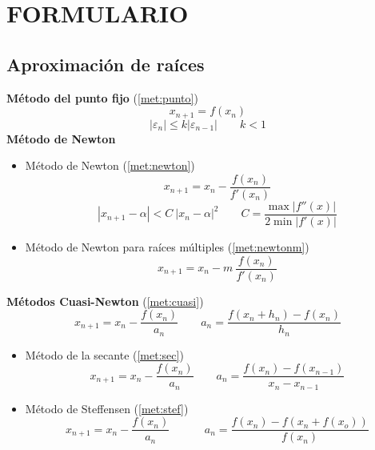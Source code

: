 \chapter*{FORMULARIO}
\section*{Aproximación de raíces}
\noindent\textbf{Método del punto fijo} (\ref{met:punto})
$$ x_{n+1}=f(x_n)$$
$$|\varepsilon_n|\leq k |\varepsilon_{n-1}| \qquad k<1$$
\textbf{Método de Newton}
\begin{itemize}
    \item Método de Newton (\ref{met:newton})
    $$x_{n+1}=x_n-\dfrac{f(x_n)}{f'(x_n)}$$
     $$|x_{n+1}-\alpha|< C \: |x_n-\alpha|^2 \qquad C=\dfrac{\max|f''(x)|}{2\min|f'(x)|} $$
     \item Método de Newton para raíces múltiples (\ref{met:newtonm})
     $$x_{n+1}=x_n-m\: \dfrac{f(x_n)}{f'(x_n)}$$
\end{itemize}
\textbf{Métodos Cuasi-Newton} (\ref{met:cuasi})
$$x_{n+1}=x_n-\frac{f(x_n)}{a_n}\qquad a_n=\dfrac{f(x_n+h_n)-f(x_n)}{h_n}$$
\begin{itemize}
    \item Método de la secante (\ref{met:sec})
    $$x_{n+1}=x_n-\dfrac{f(x_n)}{a_n} \qquad  a_n=\dfrac{f(x_n)-f(x_{n-1})}{x_n-x_{n-1}} $$
    \item Método de Steffensen (\ref{met:stef})
    $$ x_{n+1}=x_n-\dfrac{f(x_n)}{a_n} \; \;\qquad \; \; a_n=\dfrac{f(x_n)-f(x_n+f(x_o))}{f(x_n)}$$
\end{itemize}
